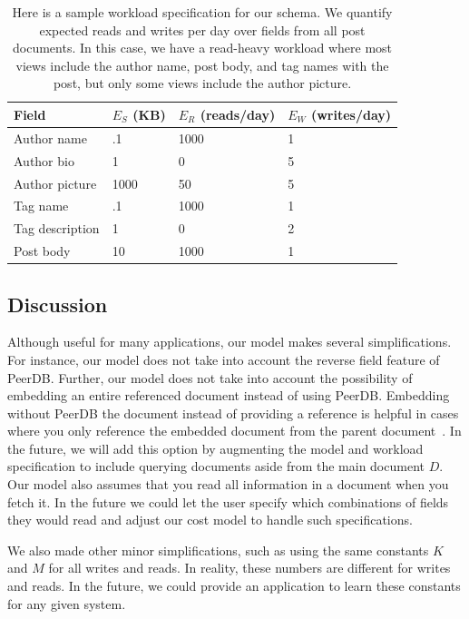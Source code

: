 \begin{table}
  \small
  \begin{center}
  \begin{tabular}{|l|l|l|l|}
    \hline
    Field & $E_S$ (KB) & $E_R$ (reads/day) & $E_W$ (writes/day)\\ \hline
    Author name & .1 & 1000 & 1 \\
    Author bio & 1 & 0 & 5 \\ 
    Author picture & 1000 & 50 & 5 \\ 
    Tag name & .1 & 1000 & 1 \\ 
    Tag description & 1 & 0 & 2 \\ 
    Post body & 10 & 1000 & 1 \\ \hline

  \end{tabular}
  \end{center}
  \caption{Here is a sample workload specification for our schema. We quantify expected reads and writes per day over fields from all post documents. In this case, we have a read-heavy workload where most views include the author name, post body, and tag names with the post, but only some views include the author picture.}
  \label{workload}
  \vspace{-4mm}
\end{table}

\subsection{Discussion}
Although useful for many applications, our model makes several simplifications. 
For instance, our model does not take into account the reverse field feature of PeerDB. 
Further, our model does not take into account the possibility of embedding an entire referenced document instead of using PeerDB. 
Embedding without PeerDB the document instead of providing a reference is helpful in cases where you only reference the embedded document from the parent document~\cite{MongoDB2014}. 
In the future, we will add this option by augmenting the model and workload specification to include querying documents aside from the main document $D$. 
Our model also assumes that you read all information in a document when you fetch it. 
In the future we could let the user specify which combinations of fields they would read and adjust our cost model to handle such specifications.

We also made other minor simplifications, such as using the same constants $K$ and $M$ for all writes and reads. 
In reality, these numbers are different for writes and reads. 
In the future, we could provide an application to learn these constants for any given system. 
